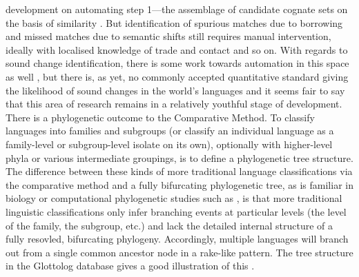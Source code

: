 development on automating step 1---the assemblage of candidate cognate sets on the basis of similarity \autocites{list_potential_2017}{rama_are_2018}{list_sequence_2018}. But identification of spurious matches due to borrowing and missed matches due to semantic shifts still requires manual intervention, ideally with localised knowledge of trade and contact and so on. With regards to sound change identification, there is some work towards automation in this space as well \autocites{steiner_pipeline_2011}{brown_sound_2013}{bouchard-cote_automated_2013}{hruschka_detecting_2015}, but there is, as yet, no commonly accepted quantitative standard giving the likelihood of sound changes in the world's languages and it seems fair to say that this area of research remains in a relatively youthful stage of development. There is a phylogenetic outcome to the Comparative Method. To classify languages into families and subgroups (or classify an individual language as a family-level or subgroup-level isolate on its own), optionally with higher-level phyla or various intermediate groupings, is to define a phylogenetic tree structure. The difference between these kinds of more traditional language classifications via the comparative method and a fully bifurcating phylogenetic tree, as is familiar in biology or computational phylogenetic studies such as \textcite{bowern_computational_2012}, is that more traditional linguistic classifications only infer branching events at particular levels (the level of the family, the subgroup, etc.) and lack the detailed internal structure of a fully resovled, bifurcating phylogeny. Accordingly, multiple languages will branch out from a single common ancestor node in a rake-like pattern. The tree structure in the Glottolog database gives a good illustration of this \autocite{hammarstrom_glottolog_2020}.

